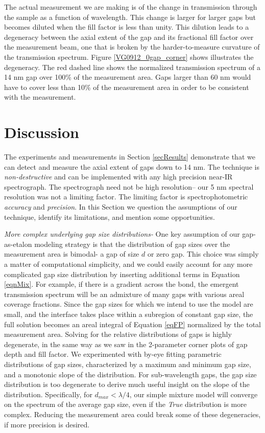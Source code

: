\documentclass[osajnl,preprint,showpacs,superscriptaddress,12pt]{revtex4-1} %
\begin{document}
The actual measurement we are making is of the change in transmission through the sample as a function of wavelength.  This change is larger for larger gaps but becomes diluted when the fill factor is less than unity.  This dilution leads to a degeneracy between the axial extent of the gap and its fractional fill factor over the measurement beam,  one that is broken by the harder-to-measure curvature of the transmission spectrum.  Figure \ref{VG0912_0gap_corner} shows illustrates the degeneracy.  The red dashed line shows the normalized transmission spectrum of a 14 nm gap over 100\% of the measurement area.  Gaps larger than 60 nm would have to cover less than 10\% of the measurement area in order to be consistent with the measurement.


\section{Discussion}

The experiments and measurements in Section \ref{secResults} demonstrate that we can detect and measure the axial extent of gaps down to 14 nm.  The technique is \emph{non-destructive} and can be implemented with any high precision near-IR spectrograph.  The spectrograph need not be high resolution-- our 5 nm spectral resolution was not a limiting factor.  The limiting factor is spectrophotometric \emph{accuracy} and \emph{precision}.  In this Section we question the assumptions of our technique, identify its limitations, and mention some opportunities.

\emph{More complex underlying gap size distributions-} One key assumption of our gap-as-etalon modeling strategy is that the distribution of gap sizes over the measurement area is bimodal- a gap of size $d$ or zero gap.  This choice was simply a matter of computational simplicity, and we could easily account for any more complicated gap size distribution by inserting additional terms in Equation \ref{eqnMix}.  For example, if there is a gradient across the bond, the emergent transmission spectrum will be an admixture of many gaps with various areal coverage fractions.  Since the gap sizes for which we intend to use the model are small, and the interface takes place within a subregion of constant gap size, the full solution becomes an areal integral of Equation \ref{eqFP} normalized by the total measurement area.  Solving for the relative distributions of gaps is highly degenerate, in the same way as we saw in the 2-parameter corner plots of gap depth and fill factor.  We experimented with by-eye fitting parametric distributions of gap sizes, characterized by a maximum and minimum gap size, and a monotonic slope of the distribution.  For sub-wavelength gaps, the gap size distribution is too degenerate to derive much useful insight on the slope of the distribution.  Specifically, for $d_{max}<\lambda/4$, our simple mixture model will converge on the spectrum of the average gap size, even if the \emph{True} distribution is more complex.  Reducing the measurement area could break some of these degeneracies, if more precision is desired.
\end{document}
